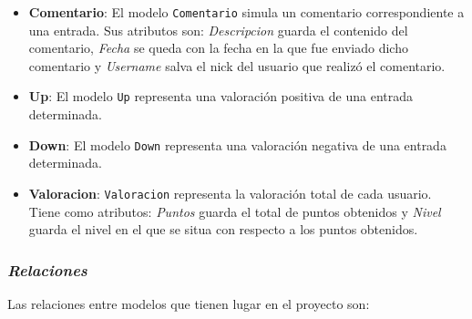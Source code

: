 \documentclass[a4paper, 12pt]{book}
\begin{document}
\begin{itemize}
  \textit{UrlBlog} guarda la url del blog de usuario, \textit{TotalUp} guarda el n\'umero total de valoraciones positivas que recopila la entrada, 
  \textit{TotalDown} guarda el n\'umero total de valoraciones negativas que recopila la entrada, \textit{Total} guarda la puntuaci\'on que lleva hasta el
  momento la entrada teniendo en cuenta valoraciones positivas y valoraciones negativas \rule[1mm]{4mm}{0.1mm}esta puntuaci\'on se usa para imprimir en 
  la secci\'on de entradas m\'as valoradas\rule[1mm]{4mm}{0.1mm} y \textit{TotalComentarios} cuenta el total de comentarios que contiene la entrada 
  \rule[1mm]{4mm}{0.1mm}este entero se mostrar\'a entre par\'entesis al lado de ''Mostrar comentarios''\rule[1mm]{4mm}{0.1mm}.
  \item {\bfseries Comentario}: El modelo \texttt{Comentario} simula un comentario correspondiente a una entrada. Sus atributos son: \textit{Descripcion}
  guarda el contenido del comentario, \textit{Fecha} se queda con la fecha en la que fue enviado dicho comentario y \textit{Username} salva el nick del 
  usuario que realiz\'o el comentario.
  \item {\bfseries Up}: El modelo \texttt{Up} representa una valoraci\'on positiva de una entrada determinada.
  \item {\bfseries Down}: El modelo \texttt{Down} representa una valoraci\'on negativa de una entrada determinada.
  \item {\bfseries Valoracion}: \texttt{Valoracion} representa la valoraci\'on total de cada usuario. Tiene como atributos: \textit{Puntos} guarda el total
  de puntos obtenidos y \textit{Nivel} guarda el nivel en el que se situa con respecto a los puntos obtenidos.
\end{itemize}

\subsubsection{\textit{Relaciones}} 
\label{sec:relaciones}
Las relaciones entre modelos que tienen lugar en el proyecto son:
\end{document}
